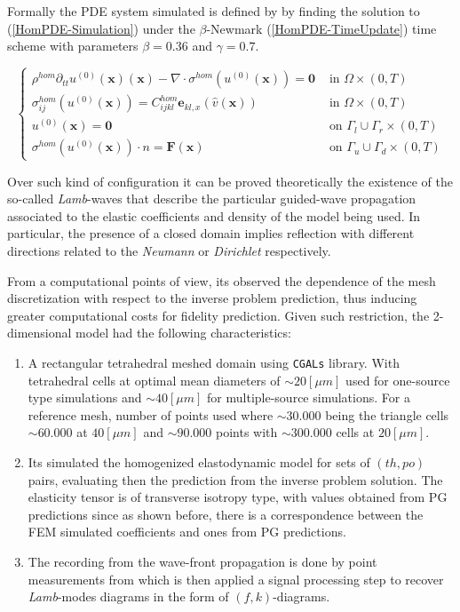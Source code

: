 Formally the PDE system simulated is defined by
by finding the solution to (\ref{HomPDE-Simulation}) under the $\beta$-Newmark (\ref{HomPDE-TimeUpdate}) time scheme with parameters $\beta = 0.36$ and $\gamma = 0.7$.

\begin{equation}
    \label{HomPDE-Simulation}
    \left \{
    \begin{array}{cc}
        \rho^{hom} \partial_{tt} u^{(0)}(\mathbf{x}) (\mathbf{x}) - \nabla \cdot \sigma^{hom} (u^{(0)}(\mathbf{x}) ) = \mathbf{0} & \text{ in } \Omega \times(0,T) \\
        \sigma^{hom}_{ij}(u^{(0)}(\mathbf{x})) = C^{hom}_{ijkl}\mathbf{e}_{kl,x}(\hat{v}(\mathbf{x})) & \text{ in } \Omega\times(0,T) \\
        u^{(0)}(\mathbf{x}) = \mathbf{0} & \text{ on } \Gamma_l \cup \Gamma_r \times(0,T) \\
        \sigma^{hom}(u^{(0)}(\mathbf{x})) \cdot n = \mathbf{F}(\mathbf{x}) & \text{ on } \Gamma_u \cup \Gamma_d \times (0,T)
    \end{array}
    \right .
\end{equation}

Over such kind of configuration it can be proved theoretically the existence of the so-called \textit{Lamb}-waves that describe the particular guided-wave propagation associated to the elastic coefficients and density of the model being used.
In particular, the presence of a closed domain implies reflection with different directions related to the \textit{Neumann} or \textit{Dirichlet} respectively.


From a computational points of view, its observed the dependence of the mesh discretization with respect to the inverse problem prediction, thus inducing greater computational costs for fidelity prediction. Given such restriction, the 2-dimensional model had the following characteristics:
\begin{enumerate}
    \item A rectangular tetrahedral meshed domain using \texttt{CGALs} library. With tetrahedral cells at optimal mean diameters of $\sim 20 [\mu m]$ used for one-source type simulations and $\sim 40 [\mu m]$ for multiple-source simulations. For a reference mesh, number of points used where $\sim 30.000$ being the triangle cells $\sim 60.000$ at $40 [\mu m]$ and $\sim 90.000$ points with $\sim 300.000$ cells at $20 [\mu m]$.
    \item Its simulated the homogenized elastodynamic model for sets of $(th, po)$ pairs, evaluating then the prediction from the inverse problem solution. The elasticity tensor is of transverse isotropy type, with values obtained from PG predictions since as shown before, there is a correspondence between the FEM simulated coefficients and ones from PG predictions.
    \item The recording from the wave-front propagation is done by point measurements from which is then applied a signal processing step to recover \textit{Lamb}-modes diagrams in the form of $(f,k)$-diagrams.
\end{enumerate}

